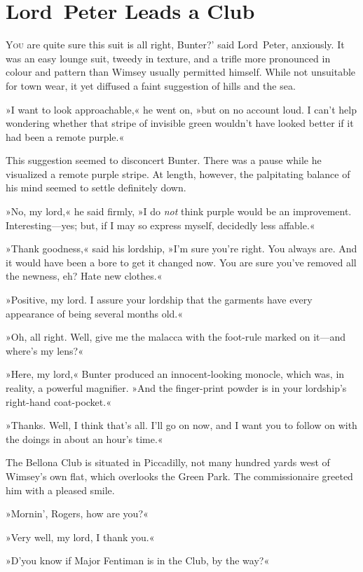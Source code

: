 \chapter{Lord~Peter Leads a Club}
\lettrine[lines=4,ante=‘]{Y}{ou} are quite sure this suit is all right, Bunter?' said Lord~Peter, anxiously. It was an easy lounge suit, tweedy in texture, and a trifle more pronounced in colour and pattern than Wimsey usually permitted himself. While not unsuitable for town wear, it yet diffused a faint suggestion of hills and the sea.

»I want to look approachable,« he went on, »but on no account loud. I can't help wondering whether that stripe of invisible green wouldn't have looked better if it had been a remote purple.«

This suggestion seemed to disconcert Bunter. There was a pause while he visualized a remote purple stripe. At length, however, the palpitating balance of his mind seemed to settle definitely down.

»No, my lord,« he said firmly, »I do \textit{not} think purple would be an improvement. Interesting—yes; but, if I may so express myself, decidedly less affable.«

»Thank goodness,« said his lordship, »I'm sure you're right. You always are. And it would have been a bore to get it changed now. You are sure you've removed all the newness, eh? Hate new clothes.«

»Positive, my lord. I assure your lordship that the garments have every appearance of being several months old.«

»Oh, all right. Well, give me the malacca with the foot-rule marked on it—and where's my lens?«

»Here, my lord,« Bunter produced an innocent-looking monocle, which was, in reality, a powerful magnifier. »And the finger-print powder is in your lordship's right-hand coat-pocket.«

»Thanks. Well, I think that's all. I'll go on now, and I want you to follow on with the doings in about an hour's time.«

The Bellona Club is situated in Piccadilly, not many hundred yards west of Wimsey's own flat, which overlooks the Green Park. The commissionaire greeted him with a pleased smile.

»Mornin', Rogers, how are you?«

»Very well, my lord, I thank you.«

»D'you know if Major Fentiman is in the Club, by the way?«

